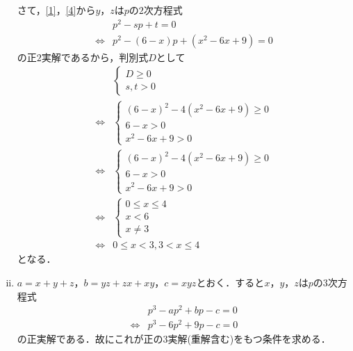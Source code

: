 \documentclass[a4j]{jarticle}
\begin{document}
\begin{multicols}{2}
\begin{enumerate}[(i)]
     さて，\eqref{1}，\eqref{4}から$y$，$z$は$p$の$2$次方程式
          \begin{align*}
          &p^2-sp+t=0\\ 
          \Longleftrightarrow &p^2-(6-x)p+(x^2-6x+9)=0 
          \end{align*}
     の正$2$実解であるから，判別式$D$として     
          \begin{align*}
          &\left\{
               \begin{array}{l}
               D\ge0  \\
               s,t>0
               \end{array}
          \right.  \\
          \Longleftrightarrow&\left\{
               \begin{array}{l}
               (6-x)^2-4(x^2-6x+9)\ge0  \\
               6-x>0  \\
               x^2-6x+9>0
               \end{array}
          \right.\\
          \Longleftrightarrow&\left\{
               \begin{array}{l}
               (6-x)^2-4(x^2-6x+9)\ge0  \\
               6-x>0  \\
               x^2-6x+9>0
               \end{array}
          \right.\\
          \Longleftrightarrow&\left\{
               \begin{array}{l}
               0\le x\le 4  \\
               x<6  \\
               x\not=3
               \end{array}
          \right. \\
          \Longleftrightarrow&
               0\le x<3,3<x\le 4  \tag{答}
          \end{align*} 
となる．     
     \item $a=x+y+z$，$b=yz+zx+xy$，$c=xyz$とおく．すると$x$，$y$，$z$は$p$の$3$次方程式
          \begin{align}
          &p^3-ap^2+bp-c=0  \nonumber\\
          \Longleftrightarrow&p^3-6p^2+9p-c=0 \label{5}
          \end{align}
     の正実解である．故にこれが正の$3$実解(重解含む)をもつ条件を求める．
          \begin{center}          

\end{center}
\end{enumerate}
\end{multicols}
\end{document}
